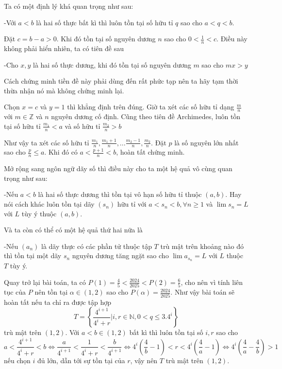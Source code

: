 \documentclass[11pt]{scrartcl}
\begin{document}
\begin{itemize}[label=, leftmargin=0em, itemsep=0.5em]
\begin{sol}
        Ta có một định lý khá quan trọng như sau:
        \begin{theo}
            -Với $a < b$ là hai số thực bất kì thì luôn tồn tại số hữu tỉ $q$ sao cho $a < q < b$.
        \end{theo}
        Đặt $c = b - a > 0$. Khi đó tồn tại số nguyên dương $n$ sao cho $0 < \frac{1}{n} < c$. Điều này không phải hiển nhiên, ta có tiên đề sau
        \begin{theo}
            -Cho $x,y$ là hai số thực dương, khi đó tồn tại số nguyên dương $m$ sao cho $mx > y$
        \end{theo}
        Cách chứng minh tiền đề này phải dùng đến  rất phức tạp nên ta hãy tạm thời thừa nhận nó mà không chứng minh lại.



        Chọn $x = c$ và $y = 1$ thì khẳng định trên đúng. Giờ ta xét các số hữu tỉ dạng $\frac{m}{n}$ với $m \in \mathbb{Z}$ và $n$ nguyên dương cố định. Cũng theo tiên đề Archimedes, luôn tồn tại số hữu tỉ $\frac{m_1}{n} < a$  và số hữu tỉ $\frac{m_2}{n} > b$


        Như vậy ta xét các số hữu tỉ $\frac{m_1}{n}, \frac{m_1 + 1}{n},...\frac{m_2 - 1}{n},\frac{m_2}{n}$. Đặt $p$ là số nguyên lớn nhất sao cho $\frac{p}{n} \leq a$. Khi đó có $a < \frac{p + 1}{n} < b$, hoàn tất chứng minh.


        Mở rộng sang ngôn ngữ dãy số thì điều này cho ta một hệ quả vô cùng quan trọng như sau: 
        \begin{theo}[Hệ quả 1]
            -Nếu $a < b$ là hai số thực dương thì tồn tại vô hạn số hữu tỉ thuộc $(a,b)$. Hay nói cách khác luôn tồn tại dãy $(s_n)$ hữu tỉ với $a < s_n < b, \forall n \geq 1$ và $\lim s_n = L$ với $L$ tùy ý thuộc $(a,b)$.
        \end{theo}
        Và ta còn có thể có một hệ quả thứ hai nữa là
        \begin{theo}[Hệ quả 2]
            -Nếu $(a_n)$ là dãy thực có các phần tử thuộc tập $T$ trù mật trên khoảng nào đó thì tồn tại một dãy $s_n$ nguyên dương tăng ngặt sao cho $\lim a_{s_n} = L$ với $L$ thuộc $T$ tùy ý.
        \end{theo}
        Quay trở lại bài toán, ta có $P(1) = \frac{4}{5} < \frac{2024}{2025} < P(2) = \frac{6}{5}$, cho nên vì tính liên tục của $P$ nên tồn tại $\alpha \in (1,2)$ sao cho $P(\alpha) = \frac{2024}{2025}$. Như vậy bài toán sẽ hoàn tất nếu ta chỉ ra được tập hợp 
        \[T = \left\{\frac{4^{i + 1}}{4^i + r} | i,r \in \mathbb{N}, 0 < q \leq 3.4^i\right\}\]
        trù mật trên $(1,2)$. Với $a < b \in (1,2)$ bất kì thì luôn tồn tại số $i,r$ sao cho $$ a < \frac{4^{i + 1}}{4^i + r} < b \Leftrightarrow \frac{a}{4^{i + 1}} < \frac{1}{4^i + r} < \frac{b}{4^{i + 1}} \Leftrightarrow 4^i(\frac{4}{b} - 1) < r < 4^i(\frac{4}{a} - 1) \Leftrightarrow 4^i(\frac{4}{a} - \frac{4}{b}) > 1$$  nếu chọn $i$ đủ lớn, dẫn tới sự tồn tại của $r$, vậy nên $T$ trù mật trên $(1,2)$. 


\end{sol}
\end{itemize}
\end{document}
